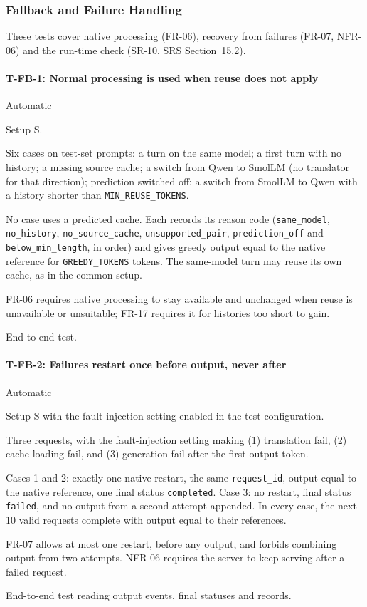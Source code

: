 \documentclass[12pt, titlepage]{article}
\newenvironment{testcase}[2]
  {\Needspace{8\baselineskip}\paragraph{#1: #2}\phantomsection\label{test:#1}\sloppy
   \begin{description}[style=sameline, leftmargin=3.6cm, labelwidth=3.4cm,
     font=\normalfont\bfseries, itemsep=2pt, topsep=2pt]}
  {\end{description}}
\newcommand{\cst}[1]{\texttt{#1}}
\begin{document}
\subsubsection{Fallback and Failure Handling}

These tests cover native processing (FR-06), recovery from failures
(FR-07, NFR-06) and the run-time check (SR-10, SRS Section~15.2).

\begin{testcase}{T-FB-1}{Normal processing is used when reuse does not
apply}
\item[Control] Automatic
\item[Initial state] Setup S.
\item[Input] Six cases on test-set prompts: a turn on the same model; a
first turn with no history; a missing source cache; a switch from Qwen to
SmolLM (no translator for that direction); prediction switched off; a
switch from SmolLM to Qwen with a history shorter than
\cst{MIN\_REUSE\_TOKENS}.
\item[Output] No case uses a predicted cache. Each records its reason code
(\texttt{same\_model}, \texttt{no\_history}, \texttt{no\_source\_cache},
\texttt{unsupported\_pair}, \texttt{prediction\_off} and
\texttt{below\_min\_length}, in order) and
gives greedy output equal to the native reference for
\cst{GREEDY\_TOKENS} tokens. The same-model turn may reuse its own cache,
as in the common setup.
\item[Derivation] FR-06 requires native processing to stay available and
unchanged when reuse is unavailable or unsuitable; FR-17 requires it for
histories too short to gain.
\item[How performed] End-to-end test.
\end{testcase}

\begin{testcase}{T-FB-2}{Failures restart once before output, never after}
\item[Control] Automatic
\item[Initial state] Setup S with the fault-injection setting enabled in
the test configuration.
\item[Input] Three requests, with the fault-injection setting making
(1) translation fail, (2) cache loading fail, and (3) generation fail after
the first output token.
\item[Output] Cases 1 and 2: exactly one native restart, the same
\texttt{request\_id}, output equal to the native reference, one final
status \texttt{completed}. Case 3: no restart, final status
\texttt{failed}, and no output from a second attempt appended. In every
case, the next 10 valid requests complete with output equal to their
references.
\item[Derivation] FR-07 allows at most one restart, before any output,
and forbids combining output from two attempts. NFR-06 requires the server
to keep serving after a failed request.
\item[How performed] End-to-end test reading output events, final statuses and
records.
\end{testcase}
\end{document}
